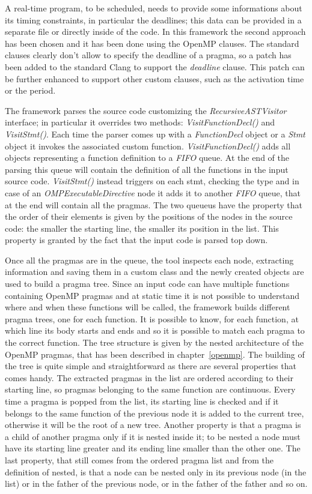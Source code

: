 \documentclass[a4paper,11pt,oneside]{book}
\begin{document}
A real-time program, to be scheduled, needs to provide some informations about its timing constraints, in particular the deadlines; this data can be provided in a separate file or directly inside of the code. In this framework the second approach has been chosen and it has been done using the OpenMP clauses. The standard clauses clearly don’t allow to specify the deadline of a pragma, so a patch has been added to the standard Clang to support the \emph{deadline} clause. This patch can be further enhanced to support other custom clauses, such as the activation time or the period.

The framework parses the source code customizing the \emph{RecursiveASTVisitor} interface; in particular it overrides two methods: \emph{VisitFunctionDecl()} and \emph{VisitStmt()}. Each time the parser comes up with a \emph{FunctionDecl} object or a \emph{Stmt} object it invokes the associated custom function. \emph{VisitFunctionDecl()} adds all objects representing a function definition to a \emph{FIFO} queue.  At the end of the parsing this queue will contain the definition of all the functions in the input source code. \emph{VisitStmt()} instead triggers on each stmt, checking the type and in case of an \emph{OMPExecutableDirective} node it adds it to another \emph{FIFO} queue, that at the end will contain all the pragmas. The two queueus have the property that the order of their elements is given by the positions of the nodes in the source code: the smaller the starting line, the smaller its position in the list. This property is granted by the fact that the input code is parsed top down.

Once all the pragmas are in the queue, the tool inspects each node, extracting information and saving them in a custom class and the newly created objects are used to build a pragma tree. Since an input code can have multiple functions containing OpenMP pragmas and at static time it is not possible to understand where and when these functions will be called, the framework builds different pragma trees, one for each function. It is possible to know, for each function, at which line its body starts and ends and so it is possible to match each pragma to the correct function. The tree structure is given by the nested architecture of the OpenMP pragmas, that has been described in chapter~\ref{openmp}. The building of the tree is quite simple and straightforward as there are several properties that comes handy. The extracted pragmas in the list are ordered according to their starting line, so pragmas belonging to the same function are continuous. Every time a pragma is popped from the list, its starting line is checked and if it belongs to the same function of the previous node it is added to the current tree, otherwise it will be the root of a new tree. Another property is that a pragma is a child of another pragma only if it is nested inside it; to be nested a node must have its starting line greater and its ending line smaller than the other one.  The last property, that still comes from the ordered pragma list and from the definition of nested, is that a node can be nested only in its previous node (in the list) or in the father of the previous node, or in the father of the father and so on.
\end{document}
